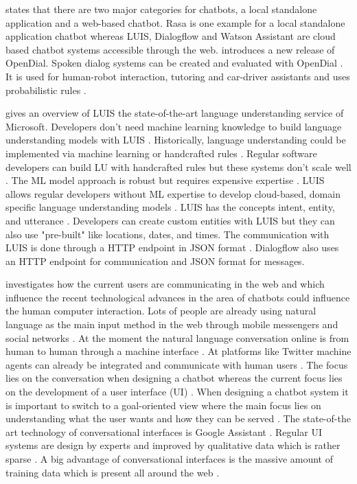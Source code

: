 \documentclass[12pt, backref]{report}
\begin{document}
\citet{kane2016role} states that there are two major categories for chatbots, a local standalone application and a web-based chatbot. Rasa is one example for a local standalone application chatbot whereas LUIS, Dialogflow and Watson Assistant are cloud based chatbot systems accessible through the web.
\citet{lison2016opendial} introduces a new release of OpenDial. Spoken dialog systems can be created and evaluated with OpenDial \cite{lison2016opendial}. It is used for human-robot interaction, tutoring and car-driver assistants and uses probabilistic rules \cite{lison2016opendial}.

\citet{luis2015williams} gives an overview of LUIS the state-of-the-art language understanding service of Microsoft.
Developers don't need machine learning knowledge to build language understanding models with LUIS \cite{luis2015williams}.
Historically, language understanding could be implemented via machine learning or handcrafted rules \cite{luis2015williams}.
Regular software developers can build LU with handcrafted rules but these systems don't scale well \cite{luis2015williams}.
The ML model approach is robust but requires expensive expertise \cite{luis2015williams}. 
LUIS allows regular developers without ML expertise to develop cloud-based, domain specific language understanding models \cite{luis2015williams}.
LUIS has the concepts intent, entity, and utterance \cite{luis2015williams}.
Developers can create custom entities with LUIS but they can also use "pre-built" like locations, dates, and times.
The communication with LUIS is done through a HTTP endpoint in JSON format \cite{luis2015williams}. 
Dialogflow also uses an HTTP endpoint for communication and JSON format for messages. 

\citet{folstad2017chatbots} investigates how the current users are communicating in the web and which influence the recent technological advances in the area of chatbots could influence the human computer interaction.
Lots of people are already using natural language as the main input method in the web through mobile messengers and social networks \cite{folstad2017chatbots}. At the moment the natural language conversation online is from human to human through a machine interface \cite{folstad2017chatbots}. At platforms like Twitter machine agents can already be integrated and communicate with human users \cite{folstad2017chatbots}. The focus lies on the conversation when designing a chatbot whereas the current focus lies on the development of a user interface (UI) \cite{folstad2017chatbots}.
When designing a chatbot system it is important to switch to a goal-oriented view where the main focus lies on understanding what the user wants and how they can be served \cite{folstad2017chatbots}.
The state-of-the art technology of conversational interfaces is Google Assistant \cite{folstad2017chatbots}.
Regular UI systems are design by experts and improved by qualitative data which is rather sparse \cite{folstad2017chatbots}.
A big advantage of conversational interfaces is the massive amount of training data which is present all around the web \cite{folstad2017chatbots}. 
\end{document}
